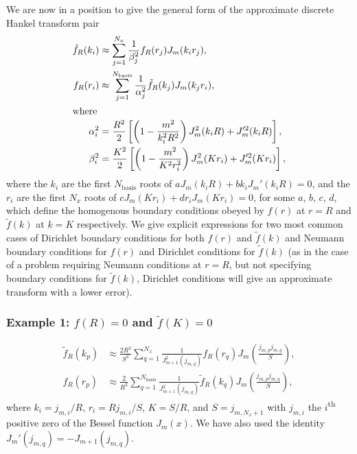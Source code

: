 \documentclass[aip,amsmath,amssymb,reprint,twocolumn]{revtex4-1}
\newcommand{\Nbasis}{{N_{\text{basis}}}}
\newcommand{\Nx}{{N_{x}}}
\begin{document}
We are now in a position to give the general form of the approximate discrete Hankel transform pair
\begin{align}
  \tilde{f}_R(k_i) &\approx \sum_{j=1}^{\Nx} \frac{1}{\beta_j^2} f_R(r_j) J_m(k_i r_j), \label{eq:GeneralDiscreteHankelTransform}\\
  f_R(r_i) &\approx \sum_{j=1}^{\Nbasis} \frac{1}{\alpha_j^2} \tilde{f}_R(k_j) J_m(k_j r_i), \label{eq:GeneralDiscreteInverseHankelTransform}\\
  \intertext{where}
  \alpha_i^2 &= \frac{R^2}{2} \left[\left(1 - \frac{m^2}{k_i^2 R^2}\right) J_m^2(k_i R) + J_m'^2(k_i R)\right], \label{eq:GeneralAlpha}\\
  \beta_i^2 &= \frac{K^2}{2} \left[\left(1 - \frac{m^2}{K^2 r_i^2}\right) J_m^2(K r_i) + J_m'^2(K r_i)\right], \label{eq:GeneralBeta}
\end{align}
where the $k_i$ are the first $\Nbasis$ roots of $a J_m(k_i R) + b k_i J_m'(k_i R) = 0$, and the $r_i$ are the first $\Nx$ roots of $c J_m(K r_i) + d r_i J_m(K r_i) = 0$, for some $a$, $b$, $c$, $d$, which define the homogenous boundary conditions obeyed by $f(r)$ at $r=R$ and $\tilde{f}(k)$ at $k = K$ respectively.  We give explicit expressions for two most common cases of Dirichlet boundary conditions for both $f(r)$ and $\tilde{f}(k)$ and Neumann boundary conditions for $f(r)$ and Dirichlet conditions for $\tilde{f}(k)$ (as in the case of a problem requiring Neumann conditions at $r=R$, but not specifying boundary conditions for $\tilde{f}(k)$, Dirichlet conditions will give an approximate transform with a lower error).

\subsubsection{Example 1: $f(R)=0$ and $\tilde{f}(K)=0$}
\label{sec:BoundaryConditionsDirichletDirichlet}

\begin{align}
  \tilde{f}_R(k_p) &\approx \frac{2 R^2}{S^2} \sum_{q=1}^{\Nx} \frac{1}{J_{m+1}^2(j_{m,q})} f_R(r_q) J_m\left(\frac{j_{m,p} j_{m,q}}{S}\right),\\
  f_R(r_p) &\approx \frac{2}{R^2} \sum_{q=1}^{\Nbasis} \frac{1}{J_{m+1}^2(j_{m,q})} \tilde{f}_R(k_q) J_m\left(\frac{j_{m,p} j_{m,q}}{S}\right),
\end{align}
where $k_i = j_{m,i}/R$, $r_i = R j_{m,i}/S$, $K = S/R$, and $S = j_{m, \Nx+1}$ with $j_{m,i}$ the $i$\textsuperscript{th} positive zero of the Bessel function $J_m(x)$.  We have also used the identity $J_{m}'(j_{m,q}) = -J_{m+1}(j_{m,q})$.
\end{document}
